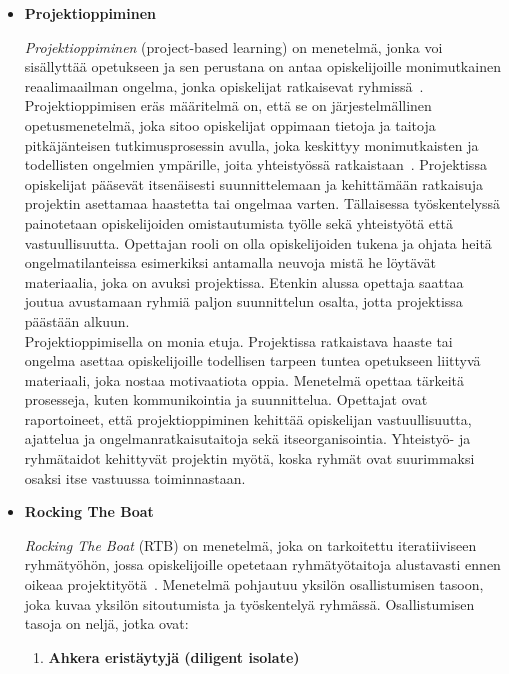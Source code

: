 \documentclass[finnish]{../tktltiki2}
\theoremstyle{definition}
\theoremstyle{remark}
\begin{document}
\begin{itemize}

\item {\bf Projektioppiminen}

\emph{Projektioppiminen} (project-based learning) on menetelmä, jonka voi sisällyttää opetukseen ja sen perustana on
antaa opiskelijoille monimutkainen reaalimaailman ongelma, jonka opiskelijat
ratkaisevat ryhmissä~\cite{Jun:2010,Larmer:2009,Markham:2003}. Projektioppimisen eräs määritelmä on, että se on järjestelmällinen
opetusmenetelmä, joka sitoo opiskelijat oppimaan tietoja ja taitoja pitkäjänteisen tutkimusprosessin
avulla, joka keskittyy monimutkaisten ja todellisten ongelmien ympärille, joita yhteistyössä
ratkaistaan~\cite{Markham:2003}. Projektissa opiskelijat pääsevät itsenäisesti suunnittelemaan ja kehittämään
ratkaisuja projektin asettamaa haastetta tai ongelmaa varten. Tällaisessa työskentelyssä painotetaan opiskelijoiden omistautumista
työlle sekä yhteistyötä että vastuullisuutta. Opettajan rooli on olla opiskelijoiden tukena ja ohjata heitä
ongelmatilanteissa esimerkiksi antamalla neuvoja mistä he löytävät materiaalia, joka on avuksi projektissa.
Etenkin alussa opettaja saattaa joutua avustamaan ryhmiä paljon suunnittelun osalta, jotta projektissa päästään alkuun.\\

Projektioppimisella on monia etuja. Projektissa ratkaistava haaste tai ongelma asettaa opiskelijoille
todellisen tarpeen tuntea opetukseen liittyvä materiaali, joka nostaa motivaatiota oppia. Menetelmä opettaa
tärkeitä prosesseja, kuten kommunikointia ja suunnittelua. Opettajat ovat raportoineet, että projektioppiminen
kehittää opiskelijan vastuullisuutta, ajattelua ja ongelmanratkaisutaitoja sekä itseorganisointia. Yhteistyö-
ja ryhmätaidot kehittyvät projektin myötä, koska ryhmät ovat suurimmaksi osaksi itse vastuussa toiminnastaan.

\item {\bf Rocking The Boat}

\emph{Rocking The Boat} (RTB) on menetelmä, joka on tarkoitettu
iteratiiviseen ryhmätyöhön, jossa opiskelijoille opetetaan ryhmätyötaitoja alustavasti ennen oikeaa projektityötä~\cite{Pieterse:2012:PPS:2157136.2157218}. Menetelmä pohjautuu yksilön osallistumisen tasoon, joka kuvaa yksilön sitoutumista ja työskentelyä ryhmässä. Osallistumisen tasoja on neljä, jotka ovat:

\begin{enumerate}

\item {\bf Ahkera eristäytyjä (diligent isolate)}


\end{enumerate}
\end{itemize}
\end{document}

